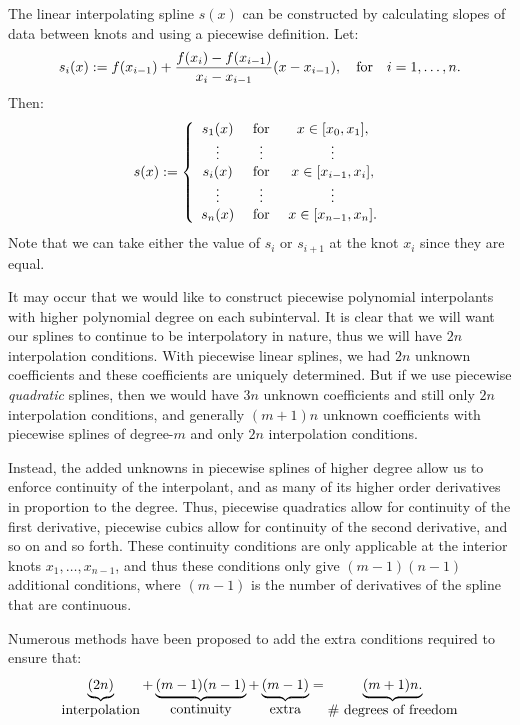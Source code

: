 The linear interpolating spline $s(x)$ can be constructed by calculating slopes of data between knots and using a piecewise definition. Let:
\[
s_i(x) := f(x_{i-1}) + \dfrac{f(x_i)-f(x_{i-1})}{x_i-x_{i-1}}(x-x_{i-1}),\quad{\rm for}\quad i=1,\ldots,n.
\]
Then:
\[
s(x) := \left\{ \begin{array}{ccc}
s_1(x) & \hbox{ for } & x\in[x_0,x_1],\\
\vdots & \vdots & \vdots\\
s_i(x) & \hbox{ for } & x\in[x_{i-1},x_i],\\
\vdots & \vdots & \vdots\\
s_n(x) & \hbox{ for } & x\in[x_{n-1},x_n].\\
\end{array}\right.
\]
Note that we can take either the value of $s_i$ or $s_{i+1}$ at the knot $x_i$ since they are equal.

It may occur that we would like to construct piecewise polynomial interpolants with higher polynomial degree on each subinterval. It is clear that we will want our splines to continue to be interpolatory in nature, thus we will have $2n$ interpolation conditions. With piecewise linear splines, we had $2n$ unknown coefficients and these coefficients are uniquely determined. But if we use piecewise {\em quadratic} splines, then we would have $3n$ unknown coefficients and still only $2n$ interpolation conditions, and generally $(m+1)n$ unknown coefficients with piecewise splines of degree-$m$ and only $2n$ interpolation conditions.

Instead, the added unknowns in piecewise splines of higher degree allow us to enforce continuity of the interpolant, and as many of its higher order derivatives in proportion to the degree. Thus, piecewise quadratics allow for continuity of the first derivative, piecewise cubics allow for continuity of the second derivative, and so on and so forth. These continuity conditions are only applicable at the interior knots $x_1,\ldots,x_{n-1}$, and thus these conditions only give $(m-1)(n-1)$ additional conditions, where $(m-1)$ is the number of derivatives of the spline that are continuous.

Numerous methods have been proposed to add the extra conditions required to ensure that:
\[
\underbrace{(2n)}_{\hbox{interpolation}} + \underbrace{(m-1)(n-1)}_{\hbox{continuity}} + \underbrace{(m-1)}_{\hbox{extra}} = \underbrace{(m+1)n.}_{\hbox{\# degrees of freedom}}
\]

